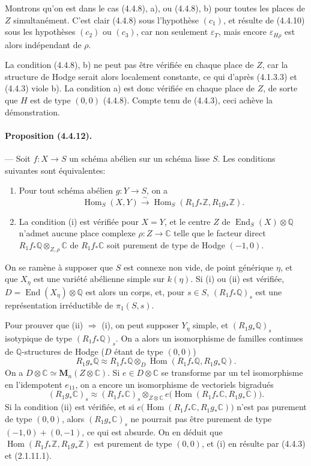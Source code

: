 \documentclass[10pt]{article}
\newcommand{\C}{\mathbb C}
\newcommand{\Q}{\mathbb Q}
\newcommand{\Z}{\mathbb Z}
\newcommand{\Hom}{\operatorname{Hom}}
\newcommand{\iso}{\xrightarrow{\sim}}
\providecommand{\End}{\operatorname{End}}
\begin{document}
Montrons qu'on est dans le cas (4.4.8), a), ou (4.4.8), b) pour toutes les places de $Z$ simultanément. C'est clair (4.4.8) sous l'hypothèse $(c_1)$, et résulte de (4.4.10) sous les hypothèses $(c_2)$ ou $(c_3)$, car non seulement $\varepsilon_T$, mais encore $\varepsilon_{H\rho}$ est alors indépendant de $\rho$.

La condition (4.4.8), b) ne peut pas être vérifiée en chaque place de $Z$, car la structure de Hodge serait alors localement constante, ce qui d'après (4.1.3.3) et (4.4.3) viole b). La condition a) est donc vérifiée en chaque place de $Z$, de sorte que $H$ est de type $(0,0)$ (4.4.8). Compte tenu de (4.4.3), ceci achève la démonstration.

\paragraph{Proposition (4.4.12).} --- Soit $f:X\to S$ un schéma abélien sur un schéma lisse $S$. Les conditions suivantes sont équivalentes:
\begin{enumerate}[label=(\roman*)]
\item Pour tout schéma abélien $g:Y\to S$, on a
\[
\Hom_S(X,Y)\iso \Hom_S(R_1f_*\Z,R_1g_*\Z).
\]
\item La condition (i) est vérifiée pour $X=Y$, et le centre $Z$ de $\End_S(X)\otimes\Q$ n'admet aucune place complexe $\rho:Z\to\C$ telle que le facteur direct $R_1f_*\Q\otimes_{Z,\rho}\C$ de $R_1f_*\C$ soit purement de type de Hodge $(-1,0)$.
\end{enumerate}




On se ramène à supposer que $S$ est connexe non vide, de point générique $\eta$, et que $X_\eta$ est une variété abélienne simple sur $k(\eta)$. Si (i) ou (ii) est vérifiée, $D=\End(X_\eta)\otimes\Q$ est alors un corps, et, pour $s\in S$, $(R_1f_*\Q)_s$ est une représentation irréductible de $\pi_1(S,s)$.

Pour prouver que (ii) $\Rightarrow$ (i), on peut supposer $Y_\eta$ simple, et $(R_1g_*\Q)_s$ isotypique de type $(R_1f_*\Q)_s$. On a alors un isomorphisme de familles continues de $\Q$-structures de Hodge ($D$ étant de type $(0,0)$)
\[
R_1g_*\Q\approx R_1f_*\Q\otimes_D
\Hom(R_1f_*\Q,R_1g_*\Q).
\]
On a $D\otimes\C\simeq \mathbf{M}_n(Z\otimes\C)$. Si $e\in D\otimes\C$ se transforme par un tel isomorphisme en l'idempotent $e_{11}$, on a encore un isomorphisme de vectoriels bigradués
\[
(R_1g_*\C)_s\approx (R_1f_*\C)_s\otimes_{Z\otimes\C}
e\bigl(\Hom(R_1f_*\C,R_1g_*\C)\bigr).
\]
Si la condition (ii) est vérifiée, et si $e\bigl(\Hom(R_1f_*\C,R_1g_*\C)\bigr)$ n'est pas purement de type $(0,0)$, alors $(R_1g_*\C)_s$ ne pourrait pas être purement de type $(-1,0)+(0,-1)$, ce qui est absurde. On en déduit que $\Hom(R_1f_*\Z,R_1g_*\Z)$ est purement de type $(0,0)$, et (i) en résulte par (4.4.3) et (2.1.11.1).
\end{document}

